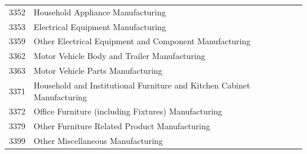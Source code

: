 \begin{longtable}{cl}
3352 &	Household Appliance Manufacturing \\
3353 &	Electrical Equipment Manufacturing \\
3359 &	Other Electrical Equipment and Component Manufacturing \\
3362 &	Motor Vehicle Body and Trailer Manufacturing \\
3363 &	Motor Vehicle Parts Manufacturing \\
3371 &	Household and Institutional Furniture and Kitchen Cabinet Manufacturing \\
3372 &	Office Furniture (including Fixtures) Manufacturing \\
3379 &	Other Furniture Related Product Manufacturing \\
3399 &	Other Miscellaneous Manufacturing \\
\end{longtable}

